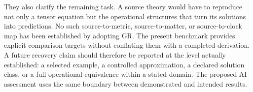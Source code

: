 \documentclass[11pt]{article}
\begin{document}
They also clarify the remaining task. A source theory would have to reproduce not only a tensor equation but the operational structures that turn its solutions into predictions. No such source-to-metric, source-to-matter, or source-to-clock map has been established by adopting GR. The present benchmark provides explicit comparison targets without conflating them with a completed derivation.
A future recovery claim should therefore be reported at the level actually established: a selected example, a controlled approximation, a declared solution class, or a full operational equivalence within a stated domain. The proposed AI assessment uses the same boundary between demonstrated and intended results.

\References
\end{document}
